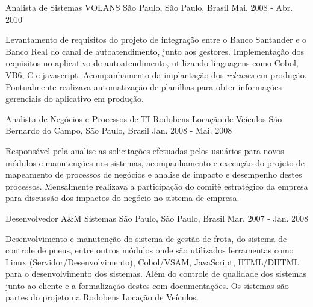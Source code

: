 \begin{cventries}
  \cventry
    {Analista de Sistemas} %
    {VOLANS} %
    {São Paulo, São Paulo, Brasil} %
    {Mai. 2008 - Abr. 2010} %
    {
      \begin{cvitems} %
        \item {Levantamento de requisitos do projeto de integração entre o Banco Santander e o Banco Real do canal de autoatendimento, junto aos gestores. Implementação dos requisitos no aplicativo de autoatendimento, utilizando linguagens como Cobol, VB6, C e javascript. Acompanhamento da implantação dos \textit{releases} em produção. Pontualmente realizava automatização de planilhas para obter informações gerenciais do aplicativo em produção.}
      \end{cvitems}
    }

  \cventry
    {Analista de Negócios e Processos de TI} %
    {Rodobens Locação de Veículos} %
    {São Bernardo do Campo, São Paulo, Brasil} %
    {Jan. 2008 - Mai. 2008} %
    {
      \begin{cvitems} %
        \item {Responsável pela analise as solicitações efetuadas pelos usuários para novos módulos e manutenções nos sistemas, acompanhamento e execução do projeto de mapeamento de processos de negócios e analise de impacto e desempenho destes processos. Mensalmente realizava a participação do comitê estratégico da empresa para discussão dos impactos do negócio no sistema de empresa.}
      \end{cvitems}
    }

  \cventry
    {Desenvolvedor} %
    {A\&M Sistemas} %
    {São Paulo, São Paulo, Brasil} %
    {Mar. 2007 - Jan. 2008} %
    {
      \begin{cvitems} %
        \item {Desenvolvimento e manutenção do sistema de gestão de frota, do sistema de controle de pneus, entre outros módulos onde são utilizados ferramentas como Linux (Servidor/Desenvolvimento), Cobol/VSAM, JavaScript, HTML/DHTML para o desenvolvimento dos sistemas. Além do controle de qualidade dos sistemas junto ao cliente e a formalização destes com documentações. Os sistemas são partes do projeto na Rodobens Locação de Veículos.}
      \end{cvitems}
    }


\end{cventries}
